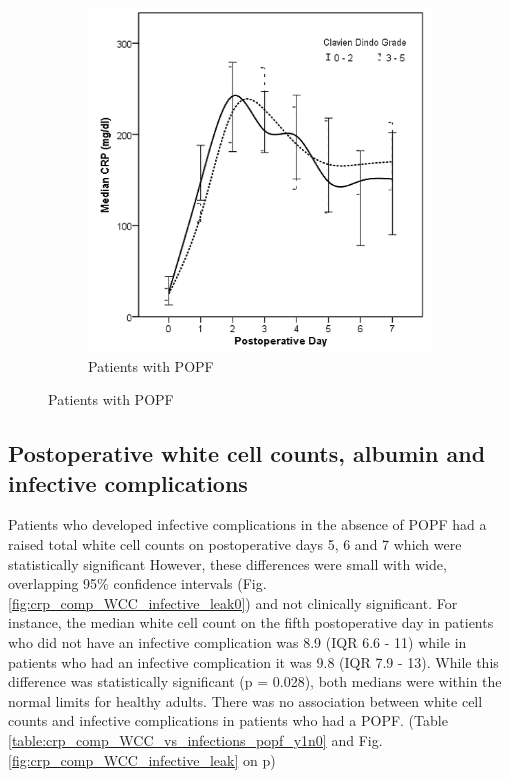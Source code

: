 \begin{figure}[t]
\begin{subfigure}{0.48\textwidth}
		\includegraphics[width=\textwidth]{Figures/crp_comp_infective_leak1}
		\caption{Patients with POPF}
		\label{fig:crp_comp_infective_leak1}
	\end{subfigure}
\end{figure}
\vfill

\clearpage

\subsection{Postoperative white cell counts, albumin and infective complications}

Patients who developed infective complications in the absence of POPF had a raised total white cell counts on postoperative days 5, 6 and 7 which were statistically significant However, these differences were small with wide, overlapping 95\% confidence intervals (Fig. \ref{fig:crp_comp_WCC_infective_leak0}) and not clinically significant. For instance, the median white cell count on the fifth postoperative day in patients who did not have an infective complication was 8.9 (IQR 6.6 - 11) while in patients who had an infective complication it was 9.8 (IQR 7.9 - 13). While this difference was statistically significant (p = 0.028), both medians were within the normal limits for healthy adults. There was no association between white cell counts and infective complications in patients who had a POPF. (Table \ref{table:crp_comp_WCC_vs_infections_popf_y1n0} and Fig. \ref{fig:crp_comp_WCC_infective_leak} on p\pageref{fig:crp_comp_WCC_infective_leak})

